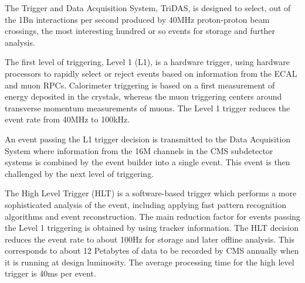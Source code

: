 The Trigger and Data Acquisition System, TriDAS, is designed to select, out of the 1Bn interactions per second produced by 40MHz proton-proton beam crossings, the most interesting hundred or so events for storage and further analysis.

The first level of triggering, Level 1 (L1), is a hardware trigger, using hardware processors to rapidly select or reject events based on information from the ECAL and muon RPCs. Calorimeter triggering is based on a first measurement of energy deposited in the crystals, whereas the muon triggering centers around transverse momentum measurements of muons. The Level 1 trigger reduces the event rate from 40MHz to 100kHz.

An event passing the L1 trigger decision is transmitted to the Data Acquisition System where information from the 16M channels in the CMS subdetector systems is combined by the event builder into a single event. This event is then challenged by the next level of triggering.

The High Level Trigger (HLT) is a software-based trigger which performs a more sophisticated analysis of the event, including applying fast pattern recognition algorithms and event reconstruction. The main reduction factor for events passing the Level 1 triggering is obtained by using tracker information. The HLT decision reduces the event rate to about 100Hz for storage and later offline analysis. This corresponds to about 12 Petabytes of data to be recorded by CMS annually when it is running at design luminosity. The average processing time for the high level trigger is 40ms per event.
